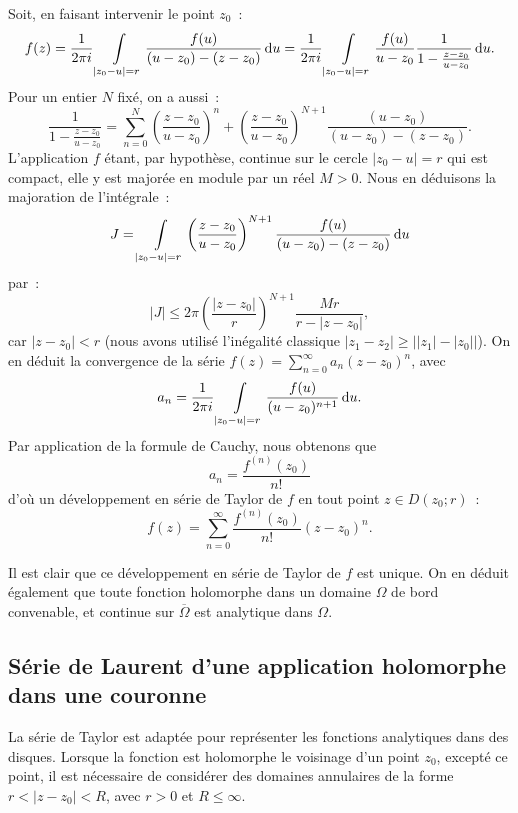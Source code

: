 Soit, en faisant intervenir le point $z_0$~:
\[
f(z) = \frac{1}{2\pi i}\int\limits_{\lvert z_0- u \rvert =r} \frac{f(u)}{(u-z_0)-(z-z_0)} \mathop{}\mathopen{}\mathrm{d} u =
\frac{1}{2\pi i}\int\limits_{\lvert z_0- u \rvert =r}
\frac{f(u)}{u-z_0}\frac{1}{1-\frac{z-z_0}{u-z_0}} \mathop{}\mathopen{}\mathrm{d} u.
\]
Pour un entier $N$ fixé, on a aussi~:
\[
\frac{1}{1-\frac{z-z_0}{u-z_0}} = \sum_{n=0}^N \left (\frac{z-z_0}{u-z_0}\right )^n + \left ( \frac{z-z_0}{u-z_0}
\right )^{N+1} \frac{(u-z_0)}{(u-z_0)-(z-z_0)}.
\]
L'application $f$ étant, par hypothèse, continue sur le cercle $\lvert z_0- u \rvert =r$ qui est compact, elle y est majorée en module par un réel $M>0$. Nous en déduisons la majoration de l'intégrale~:
\[
J=\int\limits_{\lvert z_0- u \rvert =r} \left ( \frac{z-z_0}{u-z_0}
\right )^{N+1} \frac{f(u)}{(u-z_0)-(z-z_0)} \mathop{}\mathopen{}\mathrm{d} u 
\]
par~:
\[\vert J \rvert \leq 2 \pi \left (\frac{\lvert z-z_0 \rvert}{r}
\right )^{N+1} \frac{Mr}{r-\lvert z-z_0 \rvert},
\]
car $\lvert z-z_0 \rvert <r$ (nous avons utilisé l'inégalité classique $\lvert z_1-z_2 \rvert \geq \bigl \lvert \lvert z_1\rvert-\lvert z_0 \rvert \bigr \rvert$). On en déduit la convergence de la série $f(z) = \sum_{n=0}^\infty a_n (z-z_0)^n$, avec 
\[a_n= \frac{1}{2 \pi i}\int\limits_{\lvert z_0- u \rvert =r} \frac{f(u)}{(u-z_0)^{n+1}}  \mathop{}\mathopen{}\mathrm{d} u. \]
Par application de la formule de Cauchy, nous obtenons que
\[a_n= \frac{f^{(n)}(z_0)}{n!}\]
d'où un développement en série de Taylor de $f$ en tout
point $z \in D(z_0;r)$~:
\[
f(z)= \sum_{n=0}^\infty \frac{f^{(n)}(z_0)}{n!} (z-z_0)^n.\]

Il est clair que ce développement en série de Taylor de $f$ est
unique. On en déduit également que toute fonction holomorphe dans un domaine $\Omega$ de bord convenable, et continue sur $\overline{\Omega}$ est analytique dans $\Omega$.

\subsection{Série de Laurent d'une application holomorphe dans une couronne}

La série de Taylor est adaptée pour représenter les fonctions analytiques dans des disques. Lorsque la fonction est holomorphe le voisinage d'un point $z_0$, excepté ce point, il est nécessaire de considérer des domaines annulaires de la forme $r< \lvert z-z_0 \rvert <R$, avec $r>0$ et $R \leq \infty$. 

